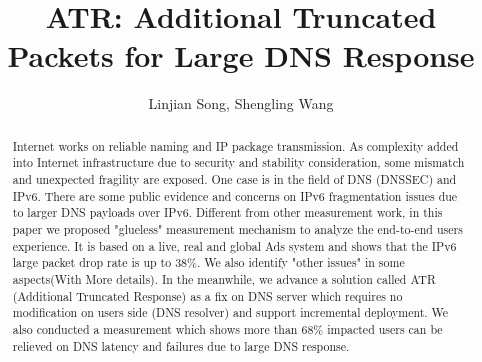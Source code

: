 \documentclass[sigconf]{acmart}
\begin{document}
\title{ATR: Additional Truncated Packets for Large DNS Response }


\author{Linjian Song, Shengling Wang}

\renewcommand{\shortauthors}{X.et al.}

\begin{abstract}
   Internet works on reliable naming and IP package transmission. 
   As complexity added into Internet infrastructure due to security 
   and stability consideration, some mismatch and unexpected fragility 
   are exposed. One case is in the field of DNS (DNSSEC) and IPv6. 
   There are some public evidence and concerns on IPv6 fragmentation 
   issues due to larger DNS payloads over IPv6. Different from other 
   measurement work, in this paper we proposed "glueless" measurement 
   mechanism to analyze the end-to-end users experience. It is based on 
   a live, real and global Ads system and shows that the IPv6 large 
   packet drop rate is up to 38\%. We also identify "other issues" 
   in some aspects(With More details). In the meanwhile, we advance 
   a solution called ATR (Additional Truncated Response) as a fix on 
   DNS server which requires no modification on users side (DNS resolver) and 
   support incremental deployment. We also conducted a measurement which shows 
   more than 68\% impacted users can be relieved on DNS latency and 
   failures due to large DNS response.
\end{abstract}

\maketitle





\end{document}
